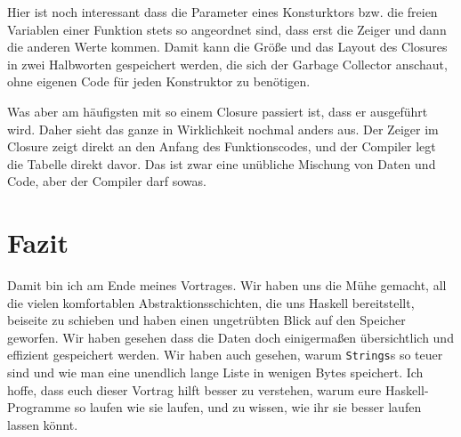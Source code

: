 \documentclass[11pt,DIV=12,parskip=half,headings=normal,abstract]{scrartcl}
\newcommand{\li}{\lstinline[style=haskell]}
\begin{document}
Hier ist noch interessant dass die Parameter eines Konsturktors bzw. die freien Variablen einer Funktion stets so angeordnet sind, dass erst die Zeiger und dann die anderen Werte kommen. Damit kann die Größe und das Layout des Closures in zwei Halbworten gespeichert werden, die sich der Garbage Collector anschaut, ohne eigenen Code für jeden Konstruktor zu benötigen.

Was aber am häufigsten mit so einem Closure passiert ist, dass er ausgeführt wird. Daher sieht das ganze in Wirklichkeit nochmal anders aus. Der Zeiger im Closure zeigt direkt an den Anfang des Funktionscodes, und der Compiler legt die Tabelle direkt davor. Das ist zwar eine unübliche Mischung von Daten und Code, aber der Compiler darf sowas.

\begin{center}
\end{center}


\section{Fazit}

Damit bin ich am Ende meines Vortrages. Wir haben uns die Mühe gemacht, all die vielen komfortablen Abstraktionsschichten, die uns Haskell bereitstellt, beiseite zu schieben und haben einen ungetrübten Blick auf den Speicher geworfen. Wir haben gesehen dass die Daten doch einigermaßen übersichtlich und effizient gespeichert werden. Wir haben auch gesehen, warum \li-Strings-s so teuer sind und wie man eine unendlich lange Liste in wenigen Bytes speichert. Ich hoffe, dass euch dieser Vortrag hilft besser zu verstehen, warum eure Haskell-Programme so laufen wie sie laufen, und zu wissen, wie ihr sie besser laufen lassen könnt.
\end{document}
